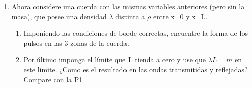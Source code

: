 \documentclass[letterpaper,11pt]{article}
\begin{document}
\begin{enumerate}
    \item  Ahora considere una cuerda con las mismas variables anteriores (pero sin la masa), que posee una densidad $\lambda$ distinta a $\rho$ entre x=0 y x=L.
   \begin{enumerate}
       \item  Imponiendo las condiciones de borde correctas, encuentre la forma de los pulsos en las 3 zonas de la cuerda.
        \item Por último imponga el límite que L tienda a cero y use que $\lambda L=m$ en este límite. ¿Como es el resultado en las ondas transmitidas y reflejadas? Compare con la P1
   \end{enumerate}
        

\end{enumerate}
\end{document}
